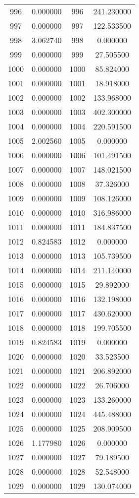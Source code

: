 \documentclass[12pt]{article}
\begin{document}
\begin{longtable}{@{}cccc@{}}
996 & 0.000000 & 996 & 241.230000 \\
997 & 0.000000 & 997 & 122.533500 \\
998 & 3.062740 & 998 & 0.000000 \\
999 & 0.000000 & 999 & 27.505500 \\
1000 & 0.000000 & 1000 & 85.824000 \\
1001 & 0.000000 & 1001 & 18.918000 \\
1002 & 0.000000 & 1002 & 133.968000 \\
1003 & 0.000000 & 1003 & 402.300000 \\
1004 & 0.000000 & 1004 & 220.591500 \\
1005 & 2.002560 & 1005 & 0.000000 \\
1006 & 0.000000 & 1006 & 101.491500 \\
1007 & 0.000000 & 1007 & 148.021500 \\
1008 & 0.000000 & 1008 & 37.326000 \\
1009 & 0.000000 & 1009 & 108.126000 \\
1010 & 0.000000 & 1010 & 316.986000 \\
1011 & 0.000000 & 1011 & 184.837500 \\
1012 & 0.824583 & 1012 & 0.000000 \\
1013 & 0.000000 & 1013 & 105.739500 \\
1014 & 0.000000 & 1014 & 211.140000 \\
1015 & 0.000000 & 1015 & 29.892000 \\
1016 & 0.000000 & 1016 & 132.198000 \\
1017 & 0.000000 & 1017 & 430.620000 \\
1018 & 0.000000 & 1018 & 199.705500 \\
1019 & 0.824583 & 1019 & 0.000000 \\
1020 & 0.000000 & 1020 & 33.523500 \\
1021 & 0.000000 & 1021 & 206.892000 \\
1022 & 0.000000 & 1022 & 26.706000 \\
1023 & 0.000000 & 1023 & 133.260000 \\
1024 & 0.000000 & 1024 & 445.488000 \\
1025 & 0.000000 & 1025 & 208.909500 \\
1026 & 1.177980 & 1026 & 0.000000 \\
1027 & 0.000000 & 1027 & 79.189500 \\
1028 & 0.000000 & 1028 & 52.548000 \\
1029 & 0.000000 & 1029 & 130.074000 \\

\end{longtable}
\end{document}

